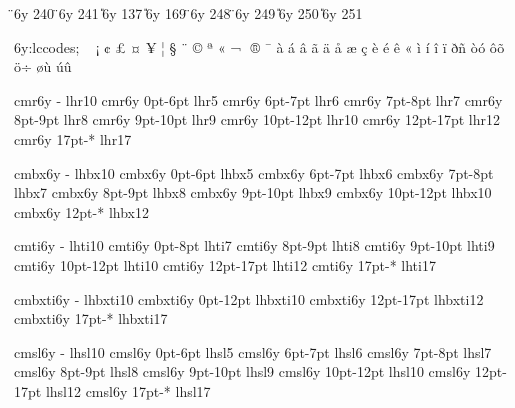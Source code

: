\accentdef \"  \CYRE   6y  240
\accentdef \"  \cyre   6y  241
\accentdef \U  \CYRI   6y  137
\accentdef \U  \cyri   6y  169
\accentdef \"  \CYRII  6y  248
\accentdef \"  \cyrii  6y  249
\accentdef \U  \CYRU   6y  250
\accentdef \U  \cyru   6y  251

\modifydef 6y:lccodes; {%
   \skipfirststep
   \lccodes ^^80^^a0
   \lccodes ^^81^^a1
   \lccodes ^^82^^a2
   \lccodes ^^83^^a3
   \lccodes ^^84^^a4
   \lccodes ^^85^^a5
   \lccodes ^^86^^a6
   \lccodes ^^87^^a7
   \lccodes ^^88^^a8
   \lccodes ^^89^^a9
   \lccodes ^^8a^^aa
   \lccodes ^^8b^^ab
   \lccodes ^^8c^^ac
   \lccodes ^^8d^^ad
   \lccodes ^^8e^^ae
   \lccodes ^^8f^^af
   \lccodes ^^90^^e0
   \lccodes ^^91^^e1
   \lccodes ^^92^^e2
   \lccodes ^^93^^e3
   \lccodes ^^94^^e4
   \lccodes ^^95^^e5
   \lccodes ^^96^^e6
   \lccodes ^^97^^e7
   \lccodes ^^98^^e8
   \lccodes ^^99^^e9
   \lccodes ^^9a^^ea
   \lccodes ^^9b^^ab
   \lccodes ^^9c^^ec
   \lccodes ^^9d^^ed
   \lccodes ^^9e^^ee
   \lccodes ^^9f^^ef
   \lccodes ^^f0^^f1
   \lccodes ^^f2^^f3
   \lccodes ^^f4^^f5
   \lccodes ^^f6^^f7
   \lccodes ^^f8^^f9
   \lccodes ^^fa^^fb
   \def\lccodesback {\zerolccodes^^80^^ff}%
}

\registertfm cmr6y     -      lhr10 %
\registertfm cmr6y  0pt-6pt   lhr5  %
\registertfm cmr6y  6pt-7pt   lhr6  %
\registertfm cmr6y  7pt-8pt   lhr7  %
\registertfm cmr6y  8pt-9pt   lhr8  %
\registertfm cmr6y  9pt-10pt  lhr9  %
\registertfm cmr6y  10pt-12pt lhr10 %
\registertfm cmr6y  12pt-17pt lhr12 %
\registertfm cmr6y  17pt-*    lhr17 %

\registertfm cmbx6y    -      lhbx10 %
\registertfm cmbx6y 0pt-6pt   lhbx5  %
\registertfm cmbx6y 6pt-7pt   lhbx6  %
\registertfm cmbx6y 7pt-8pt   lhbx7  %
\registertfm cmbx6y 8pt-9pt   lhbx8  %
\registertfm cmbx6y 9pt-10pt  lhbx9  %
\registertfm cmbx6y 10pt-12pt lhbx10 %
\registertfm cmbx6y 12pt-*    lhbx12 %

\registertfm cmti6y    -      lhti10 %
\registertfm cmti6y 0pt-8pt   lhti7  %
\registertfm cmti6y 8pt-9pt   lhti8  %
\registertfm cmti6y 9pt-10pt  lhti9  %
\registertfm cmti6y 10pt-12pt lhti10 %
\registertfm cmti6y 12pt-17pt lhti12 %
\registertfm cmti6y 17pt-*    lhti17 %

\registertfm cmbxti6y    -      lhbxti10 %
\registertfm cmbxti6y 0pt-12pt  lhbxti10 %
\registertfm cmbxti6y 12pt-17pt lhbxti12 %
\registertfm cmbxti6y 17pt-*    lhbxti17 %

\registertfm cmsl6y     -      lhsl10 %
\registertfm cmsl6y  0pt-6pt   lhsl5  %
\registertfm cmsl6y  6pt-7pt   lhsl6  %
\registertfm cmsl6y  7pt-8pt   lhsl7  %
\registertfm cmsl6y  8pt-9pt   lhsl8  %
\registertfm cmsl6y  9pt-10pt  lhsl9  %
\registertfm cmsl6y  10pt-12pt lhsl10 %
\registertfm cmsl6y  12pt-17pt lhsl12 %
\registertfm cmsl6y  17pt-*    lhsl17 %

